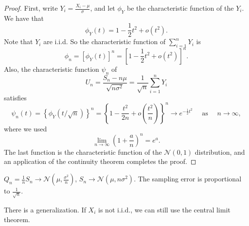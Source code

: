 \begin{proof}
First, write $Y_i = \frac{X_i - \mu}{\sigma}$, and let $\phi_Y$ be the characteristic function of the $Y_i$. We have that 
\begin{equation*}
    \phi_{Y}(t)=1-\frac{1}{2} t^{2}+o\left(t^{2}\right).
\end{equation*}
Note that $Y_i$ are i.i.d. So the characteristic function of $\sum_{i=1}^n Y_i$ is
\begin{equation*}
    \phi_n = [\phi_{Y}(t)]^n = \left[ 1-\frac{1}{2} t^{2}+o\left(t^{2}\right) \right]^n.
\end{equation*}
Also, the characteristic function $\psi_n$ of
\begin{equation*}
    U_{n}=\frac{S_{n}-n \mu}{\sqrt{n \sigma^{2}}}=\frac{1}{\sqrt{n}} \sum_{i=1}^{n} Y_{i}
\end{equation*}
satisfies
\begin{equation*}
    \psi_{n}(t)=\left\{\phi_{Y}(t / \sqrt{n})\right\}^{n}=\left\{1-\frac{t^{2}}{2 n}+o\left(\frac{t^{2}}{n}\right)\right\}^{n} \rightarrow e^{-\frac{1}{2} t^{2}} \quad \text { as } \quad  n \rightarrow \infty,
\end{equation*}
where we used 
\begin{equation*}
    \lim_{n\to\infty} \left( 1 + \frac{a}{n} \right)^n = e^a.
\end{equation*}
The last function is the characteristic function of the $\mathcal{N}(0, 1)$ distribution, and an application of the continuity theorem completes the proof.
\end{proof}

\begin{corollary}
$Q_n = \frac{1}{n}S_n \to \mathcal{N} \left(\mu, \frac{\sigma^2}{n} \right)$, $S_n \to \mathcal{N}(\mu, n \sigma^2)$. The sampling error is proportional to $\frac{1}{\sqrt{n}}$.
\end{corollary}
There is a generalization. If $X_i$ is not i.i.d., we can still use the central limit theorem.

